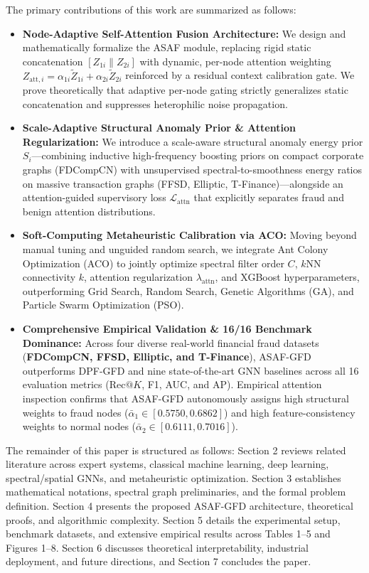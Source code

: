 \documentclass[10pt,a4paper,twocolumn]{article}
\begin{document}
The primary contributions of this work are summarized as follows:

\begin{itemize}
  \item \textbf{Node-Adaptive Self-Attention Fusion Architecture:} We design and mathematically formalize the ASAF module, replacing rigid static concatenation $[Z_{1i} \parallel Z_{2i}]$ with dynamic, per-node attention weighting $Z_{\text{att},i} = \alpha_{1i}\tilde{Z}_{1i} + \alpha_{2i}\tilde{Z}_{2i}$ reinforced by a residual context calibration gate. We prove theoretically that adaptive per-node gating strictly generalizes static concatenation and suppresses heterophilic noise propagation.
  \item \textbf{Scale-Adaptive Structural Anomaly Prior \& Attention Regularization:} We introduce a scale-aware structural anomaly energy prior $S_i$---combining inductive high-frequency boosting priors on compact corporate graphs (FDCompCN) with unsupervised spectral-to-smoothness energy ratios on massive transaction graphs (FFSD, Elliptic, T-Finance)---alongside an attention-guided supervisory loss $\mathcal{L}_{\text{attn}}$ that explicitly separates fraud and benign attention distributions.
  \item \textbf{Soft-Computing Metaheuristic Calibration via ACO:} Moving beyond manual tuning and unguided random search, we integrate Ant Colony Optimization (ACO) to jointly optimize spectral filter order $C$, $k$NN connectivity $k$, attention regularization $\lambda_{\text{attn}}$, and XGBoost hyperparameters, outperforming Grid Search, Random Search, Genetic Algorithms (GA), and Particle Swarm Optimization (PSO).
  \item \textbf{Comprehensive Empirical Validation \& 16/16 Benchmark Dominance:} Across four diverse real-world financial fraud datasets (\textbf{FDCompCN, FFSD, Elliptic, and T-Finance}), ASAF-GFD outperforms DPF-GFD and nine state-of-the-art GNN baselines across all 16 evaluation metrics ($\text{Rec}@K$, F1, AUC, and AP). Empirical attention inspection confirms that ASAF-GFD autonomously assigns high structural weights to fraud nodes ($\bar{\alpha}_1 \in [0.5750, 0.6862]$) and high feature-consistency weights to normal nodes ($\bar{\alpha}_2 \in [0.6111, 0.7016]$).
\end{itemize}

The remainder of this paper is structured as follows: Section 2 reviews related literature across expert systems, classical machine learning, deep learning, spectral/spatial GNNs, and metaheuristic optimization. Section 3 establishes mathematical notations, spectral graph preliminaries, and the formal problem definition. Section 4 presents the proposed ASAF-GFD architecture, theoretical proofs, and algorithmic complexity. Section 5 details the experimental setup, benchmark datasets, and extensive empirical results across Tables 1--5 and Figures 1--8. Section 6 discusses theoretical interpretability, industrial deployment, and future directions, and Section 7 concludes the paper.
\end{document}
